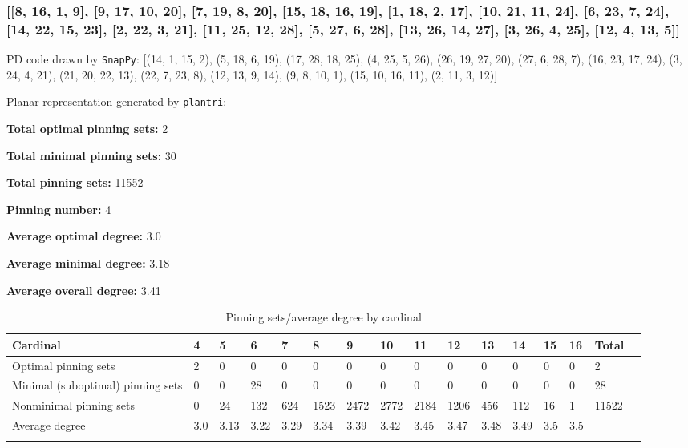 \documentclass{article}%
\begin{document}
\newpage

\subsubsection{[[8, 16, 1, 9], [9, 17, 10, 20], [7, 19, 8, 20], [15, 18, 16, 19], [1, 18, 2, 17], [10, 21, 11, 24], [6, 23, 7, 24], [14, 22, 15, 23], [2, 22, 3, 21], [11, 25, 12, 28], [5, 27, 6, 28], [13, 26, 14, 27], [3, 26, 4, 25], [12, 4, 13, 5]]}

{\small\noindent PD code drawn by \texttt{SnapPy}: [(14, 1, 15, 2), (5, 18, 6, 19), (17, 28, 18, 25), (4, 25, 5, 26), (26, 19, 27, 20), (27, 6, 28, 7), (16, 23, 17, 24), (3, 24, 4, 21), (21, 20, 22, 13), (22, 7, 23, 8), (12, 13, 9, 14), (9, 8, 10, 1), (15, 10, 16, 11), (2, 11, 3, 12)]}

{\small\noindent Planar representation generated by \texttt{plantri}: -}

\begin{multicols}{2}
{\normalsize \noindent\textbf{Total optimal pinning sets:} 2

\noindent\textbf{Total minimal pinning sets:} 30

\noindent\textbf{Total pinning sets:} 11552

\noindent\textbf{Pinning number:} 4

}
\columnbreak

{\normalsize \noindent\textbf{Average optimal degree:} 3.0

\noindent\textbf{Average minimal degree:} 3.18

\noindent\textbf{Average overall degree:} 3.41

}
\end{multicols}

\begin{table}[ht]
	\caption{Pinning sets/average degree by cardinal}
	\centering
	\renewcommand{\arraystretch}{1.5}
	\begin{tabularx}{\textwidth}{lXXXXXXXXXXXXXXX}
		\toprule
			Cardinal & 4 & 5 & 6 & 7 & 8 & 9 & 10 & 11 & 12 & 13 & 14 & 15 & 16 & Total\\
			\hline
			Optimal pinning sets & 2 & 0 & 0 & 0 & 0 & 0 & 0 & 0 & 0 & 0 & 0 & 0 & 0 & 2 \\
			Minimal (suboptimal) pinning sets & 0 & 0 & 28 & 0 & 0 & 0 & 0 & 0 & 0 & 0 & 0 & 0 & 0 & 28 \\
			Nonminimal pinning sets & 0 & 24 & 132 & 624 & 1523 & 2472 & 2772 & 2184 & 1206 & 456 & 112 & 16 & 1 & 11522 \\
			Average degree & 3.0 & 3.13 & 3.22 & 3.29 & 3.34 & 3.39 & 3.42 & 3.45 & 3.47 & 3.48 & 3.49 & 3.5 & 3.5 &  \\
		\bottomrule \\ 
	\end{tabularx}
\end{table}
\end{document}
